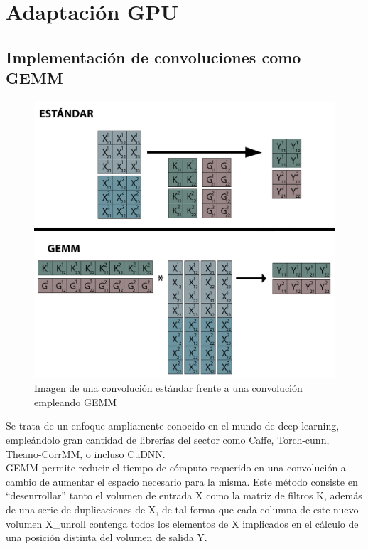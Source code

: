 \chapter{Adaptación GPU}


\section{Implementación de convoluciones como GEMM \label{Intro_GEMMM}}

\begin{figure}[H]
	\centering
	\includegraphics[scale=0.35]{imagenes/conv_std_vs_gemm.jpg}  
	\caption{Imagen de una convolución estándar frente a una convolución empleando GEMM}
	\label{fig:conv_std_vs_gemm}
\end{figure}
Se trata de un enfoque ampliamente conocido en el mundo de deep learning, empleándolo gran cantidad de librerías del sector como Caffe, Torch-cunn, Theano-CorrMM, o incluso CuDNN. \cite{conv_GEMM_FFT_comparacion} \\
GEMM permite reducir el tiempo de cómputo requerido en una convolución a cambio de aumentar el espacio necesario para la misma. Este método consiste en ``desenrrollar'' tanto el volumen de entrada X como la matriz de filtros K, además de una serie de duplicaciones de X, de tal forma que cada columna de este nuevo volumen X\_unroll contenga todos los elementos de X implicados en el cálculo de una posición distinta del volumen de salida Y. \\
